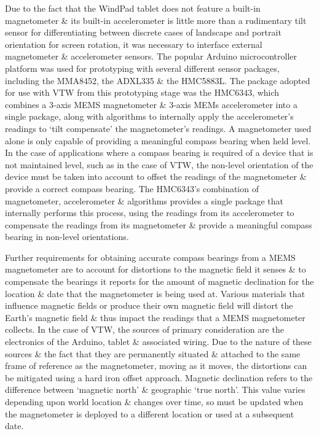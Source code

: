 Due to the fact that the WindPad tablet does not feature a built-in magnetometer \& its built-in accelerometer is little more than a rudimentary tilt sensor for differentiating between discrete cases of landscape and portrait orientation for screen rotation, it was necessary to interface external magnetometer \& accelerometer sensors. The popular Arduino\ArduinoFootnote{} microcontroller platform was used for prototyping with several different sensor packages, including the MMA8452\MMAfootnote{}, the ADXL335\ADXLfootnote{} \& the HMC5883L\HMCfootnote{}. The package adopted for use with VTW from this prototyping stage was the HMC6343\HMCtwoFootnote{}, which combines a 3-axis MEMS magnetometer \& 3-axis MEMs accelerometer into a single package, along with algorithms to internally apply the accelerometer's readings to `tilt compensate' the magnetometer's readings. A magnetometer used alone is only capable of providing a meaningful compass bearing when held level. In the case of applications where a compass bearing is required of a device that is not maintained level, such as in the case of VTW, the non-level orientation of the device must be taken into account to offset the readings of the magnetometer \& provide a correct compass bearing. The HMC6343's combination of magnetometer, accelerometer \& algorithms provides a single package that internally performs this process, using the readings from its accelerometer to compensate the readings from its magnetometer \& provide a meaningful compass bearing in non-level orientations.

Further requirements for obtaining accurate compass bearings from a MEMS magnetometer are to account for distortions to the magnetic field it senses \& to compensate the bearings it reports for the amount of magnetic declination for the location \& date that the magnetometer is being used at. Various materials that influence magnetic fields or produce their own magnetic field will distort the Earth's magnetic field \& thus impact the readings that a MEMS magnetometer collects. In the case of VTW, the sources of primary consideration are the electronics of the Arduino, tablet \& associated wiring. Due to the nature of these sources \& the fact that they are permanently situated \& attached to the same frame of reference as the magnetometer, moving as it moves, the distortions can be mitigated using a hard iron offset approach. Magnetic declination refers to the difference between `magnetic north' \& geographic `true north'. This value varies depending upon world location \& changes over time, so must be updated when the magnetometer is deployed to a different location or used at a subsequent date.

